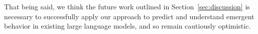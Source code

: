 \documentclass{article} %
\begin{document}
That being said, we think the future work outlined in Section~\ref{sec:discussion} is necessary to successfully apply our approach to predict and understand emergent behavior in existing large language models, and so remain cautiously optimistic.

\label{sec:further-progress-measures}



\end{document}
